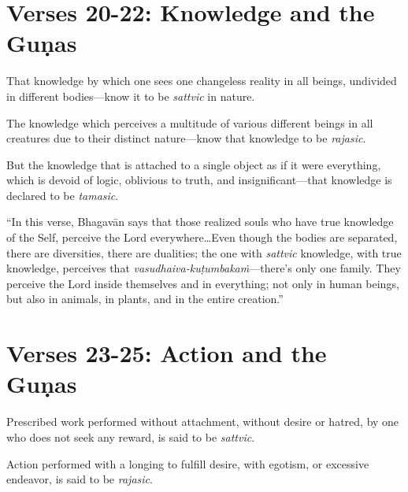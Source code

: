 \section{Verses 20-22: Knowledge and the Guṇas}\label{sec-verses-20-22-knowledge-and-the-gunas}

{That knowledge by which one sees one changeless reality in all beings, undivided in different bodies---know it to be \textit{sattvic} in nature.}

{The knowledge which perceives a multitude of various different beings in all creatures due to their distinct nature---know that knowledge to be \textit{rajasic}.}

{But the knowledge that is attached to a single object as if it were everything, which is devoid of logic, oblivious to truth, and insignificant---that knowledge is declared to be \textit{tamasic}.}

\enquote{In this verse, Bhagavān says that those realized souls who have true knowledge of the Self, perceive the Lord everywhere\ldots Even though the bodies are separated, there are diversities, there are dualities; the one with \textit{sattvic} knowledge, with true knowledge, perceives that \textit{vasudhaiva-kuṭumbakaṁ}---there’s only one family. They perceive the Lord inside themselves and in everything; not only in human beings, but also in animals, in plants, and in the entire creation.}

\section{Verses 23-25: Action and the Guṇas}\label{sec-verses-23-25-action-and-the-gunas}

{Prescribed work performed without attachment, without desire or hatred, by one who does not seek any reward, is said to be \textit{sattvic}.}

{Action performed with a longing to fulfill desire, with egotism, or excessive endeavor, is said to be \textit{rajasic}.}


